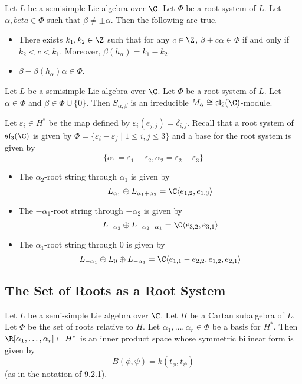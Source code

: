 \documentclass[a4paper]{article}
\begin{document}
\begin{lmm}{}{} Let $L$ be a semisimple Lie algebra over $\C$. Let $\Phi$ be a root system of $L$. Let $\alpha,beta\in\Phi$ such that $\beta\neq\pm\alpha$. Then the following are true. 
\begin{itemize}
\item There exists $k_1,k_2\in\Z$ such that for any $c\in\Z$, $\beta+c\alpha\in\Phi$ if and only if $k_2<c<k_1$. Moreover, $\beta(h_\alpha)=k_1-k_2$. 
\item $\beta-\beta(h_\alpha)\alpha\in\Phi$. 
\end{itemize}
\end{lmm}

\begin{prp}{}{} Let $L$ be a semisimple Lie algebra over $\C$. Let $\Phi$ be a root system of $L$. Let $\alpha\in\Phi$ and $\beta\in\Phi\cup\{0\}$. Then $S_{\alpha,\beta}$ is an irreducible $M_\alpha\cong\mathfrak{sl}_2(\C)$-module. 
\end{prp}

\begin{eg}{}{} Let $\varepsilon_i\in H^\ast$ be the map defined by $\varepsilon_i(e_{j,j})=\delta_{i,j}$. Recall that a root system of $\mathfrak{sl}_3(\C)$ is given by $\Phi=\{\varepsilon_i-\varepsilon_j\;|\;1\leq i,j\leq 3\}$ and a base for the root system is given by $$\{\alpha_1=\varepsilon_1-\varepsilon_2, \alpha_2=\varepsilon_2-\varepsilon_3\}$$
\begin{itemize}
\item The $\alpha_2$-root string through $\alpha_1$ is given by $$L_{\alpha_1}\oplus L_{\alpha_1+\alpha_2}=\C\langle e_{1,2}, e_{1,3}\rangle$$
\item The $-\alpha_1$-root string through $-\alpha_2$ is given by $$L_{-\alpha_2}\oplus L_{-\alpha_2-\alpha_1}=\C\langle e_{3,2},e_{3,1}\rangle$$
\item The $\alpha_1$-root string through $0$ is given by $$L_{-\alpha_1}\oplus L_0\oplus L_{-\alpha_1}=\C\langle e_{1,1}-e_{2,2},e_{1,2}, e_{2,1}\rangle$$
\end{itemize}
\end{eg}

\subsection{The Set of Roots as a Root System}
\begin{prp}{}{} Let $L$ be a semi-simple Lie algebra over $\C$. Let $H$ be a Cartan subalgebra of $L$. Let $\Phi$ be the set of roots relative to $H$. Let $\alpha_1,\dots,\alpha_r\in\Phi$ be a basis for $H^\ast$. Then $\R[\alpha_1,\dots,\alpha_r]\subset H^\ast$ is an inner product space whose symmetric bilinear form is given by $$B(\phi,\psi)= k(t_\phi,t_\psi)$$ (as in the notation of 9.2.1). 
\end{prp}
\end{document}
